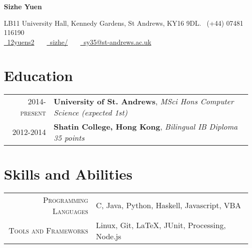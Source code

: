 \documentclass{article}
\newcommand{\n}[0]{\\[\baselineskip]}
\begin{document}
\pagestyle{empty} %


\par{\centering
		{\Large \textbf{Sizhe Yuen}
	}\par}

\begin{center}
LB11 University Hall, Kennedy Gardens, St Andrews, KY16 9DL. \faMobile\ (+44) 07481 116190\\
\href{https://github.com/12yuens2}{\faGithub\ 12yuens2} \ \ \ \href{https://www.linkedin.com/in/sizhe/}{\faLinkedin\ sizhe/} \ \ \ \href{mailto:sy35@st-andrews.ac.uk}{\faEnvelopeO\ sy35@st-andrews.ac.uk}
\end{center}

\section*{Education}
\begin{tabular}{r|p{15cm}}
\textsc{2014-present} & \textbf{University of St. Andrews}, \textit{MSci Hons Computer Science (expected 1st)}
\n

\textsc{2012-2014} & \textbf{Shatin College, Hong Kong}, \textit{Bilingual IB Diploma 35 points}
\end{tabular}

\section*{Skills and Abilities}
\begin{tabular}{r|p{15cm}}
\textsc{Programming Languages} & C, Java, Python, Haskell, Javascript, VBA\\

\textsc{Tools and Frameworks} & Linux, Git, \LaTeX, JUnit, Processing, Node.js
\end{tabular}

\end{document}

